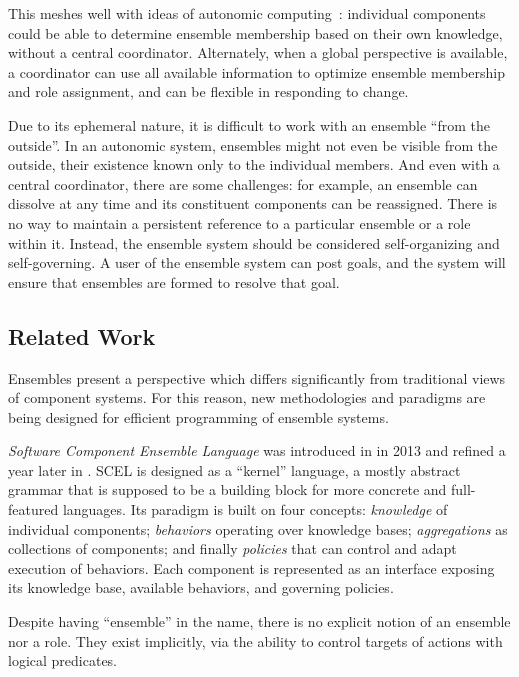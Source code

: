 This meshes well with ideas of autonomic computing~\citep{IBM2003}: individual components
could be able to determine ensemble membership based on their own knowledge, without a
central coordinator. Alternately, when a global perspective is available, a coordinator
can use all available information to optimize ensemble membership and role assignment,
and can be flexible in responding to change.

Due to its ephemeral nature, it is difficult to work with an ensemble ``from the
outside''. In an autonomic system, ensembles might not even be visible from the outside,
their existence known only to the individual members. And even with a central
coordinator, there are some challenges: for example, an ensemble can dissolve at any
time and its constituent components can be reassigned. There is no way to maintain a
persistent reference to a particular ensemble or a role within it. Instead, the ensemble
system should be considered self-organizing and self-governing. A user of the ensemble
system can post goals, and the system will ensure that ensembles are formed to resolve
that goal.

\subsection{Related Work}

Ensembles present a perspective which differs significantly from traditional views of
component systems. For this reason, new methodologies and paradigms are being designed
for efficient programming of ensemble systems.

\medskip

\textit{Software Component Ensemble Language} was introduced in \citep{SCEL2013} in 2013
and refined a year later in \citep{SCEL2014}. SCEL is designed as a ``kernel'' language,
a mostly abstract grammar that is supposed to be a building block for more concrete and
full-featured languages. Its paradigm is built on four concepts: \textit{knowledge} of
individual components; \textit{behaviors} operating over knowledge bases;
\textit{aggregations} as collections of components; and finally \textit{policies} that
can control and adapt execution of behaviors. Each component is represented as an
interface exposing its knowledge base, available behaviors, and governing policies.

Despite having ``ensemble'' in the name, there is no explicit notion of an ensemble nor
a role. They exist implicitly, via the ability to control targets of actions with
logical predicates.

